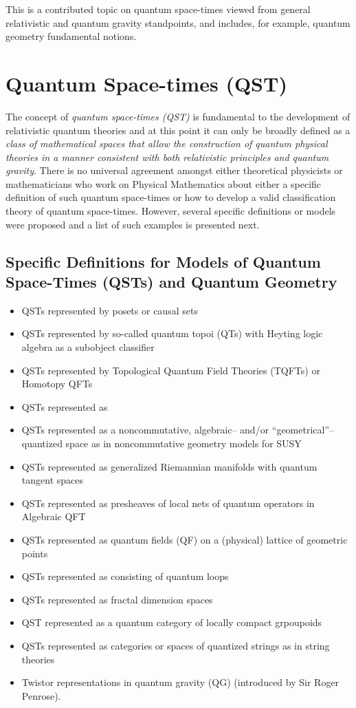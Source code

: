 \documentclass[12pt]{article}
\theoremstyle{plain}
\theoremstyle{definition}
\numberwithin{equation}{section}
\begin{document}
This is a contributed topic on quantum space-times viewed from general relativistic and quantum gravity standpoints, 
and includes, for example, quantum geometry fundamental notions.  
\section{Quantum Space-times (QST)}
The concept of \emph{quantum space-times (QST)} is fundamental to the development of relativistic quantum theories and at this point it can only be broadly defined as a \emph{class of mathematical spaces that allow the construction of quantum physical theories in a manner consistent with both relativistic principles and quantum gravity}.
There is no universal agreement amongst either theoretical physicists or mathematicians who
work on Physical Mathematics about either a specific definition of such quantum space-times or 
how to develop a valid classification theory of quantum space-times. However, several specific
definitions or models were proposed and a list of such examples is presented next.  


\subsection{Specific Definitions for Models of Quantum Space-Times (QSTs) and Quantum Geometry}
\begin{itemize}
\item QSTs represented by posets or causal sets
\item QSTs represented by so-called quantum topoi (QTs) with Heyting logic algebra as a subobject classifier
\item QSTs represented by Topological Quantum Field Theories (TQFTs) or Homotopy QFTs
\item QSTs represented as
\item QSTs represented as a noncommutative, algebraic-- and/or ``geometrical''--quantized space as in noncommutative geometry models for SUSY
\item QSTs represented as generalized Riemannian manifolds with quantum tangent spaces
\item QSTs represented as presheaves of local nets of quantum operators in Algebraic QFT
\item QSTs represented as quantum fields (QF) on a (physical) lattice of geometric points
\item QSTs represented as consisting of quantum loops 
\item QSTs represented as fractal dimension spaces
\item QST represented as a quantum category of locally compact grpoupoids
\item QSTs represented as categories or spaces of quantized strings as in string theories
\item Twistor representations in quantum gravity (QG) (introduced by Sir Roger Penrose). 
\end{itemize}
\end{document}
